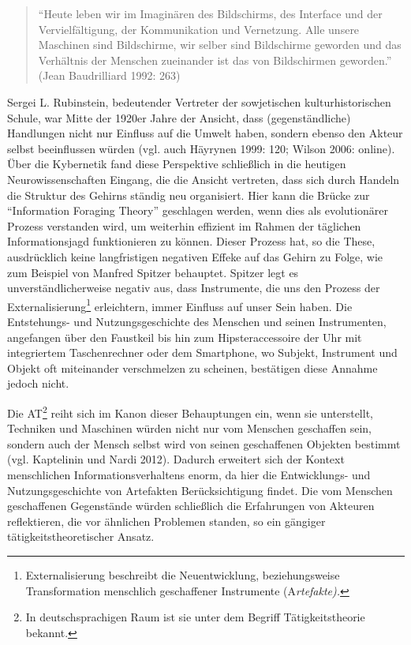 \documentclass[a4paper,
fontsize=11pt,
oneside,
numbers=noperiodatend,
parskip=half-,
bibliography=totoc,
final
]{scrartcl}
\begin{document}
\begin{quote}
\enquote{Heute leben wir im Imaginären des Bildschirms, des Interface
und der Vervielfältigung, der Kommunikation und Vernetzung. Alle unsere
Maschinen sind Bildschirme, wir selber sind Bildschirme geworden und das
Verhältnis der Menschen zueinander ist das von Bildschirmen geworden.}
(Jean Baudrilliard 1992: 263)
\end{quote}

Sergei L. Rubinstein, bedeutender Vertreter der sowjetischen
kulturhistorischen Schule, war Mitte der 1920er Jahre der Ansicht, dass
(gegenständliche) Handlungen nicht nur Einfluss auf die Umwelt haben,
sondern ebenso den Akteur selbst beeinflussen würden (vgl. auch Häyrynen
1999: 120; Wilson 2006: online). Über die Kybernetik fand diese
Perspektive schließlich in die heutigen Neurowissenschaften Eingang, die
die Ansicht vertreten, dass sich durch Handeln die Struktur des Gehirns
ständig neu organisiert. Hier kann die Brücke zur \enquote{Information
Foraging Theory} geschlagen werden, wenn dies als evolutionärer Prozess
verstanden wird, um weiterhin effizient im Rahmen der täglichen
Informationsjagd funktionieren zu können. Dieser Prozess hat, so die
These, ausdrücklich keine langfristigen negativen Effeke auf das Gehirn
zu Folge, wie zum Beispiel von Manfred Spitzer behauptet. Spitzer legt
es unverständlicherweise negativ aus, dass Instrumente, die uns den
Prozess der Externalisierung\footnote{Externalisierung beschreibt die
  Neuentwicklung, beziehungsweise Transformation menschlich geschaffener
  Instrumente (A\emph{rtefakte).}} erleichtern, immer Einfluss auf unser
Sein haben. Die Entstehungs- und Nutzungsgeschichte des Menschen und
seinen Instrumenten, angefangen über den Faustkeil bis hin zum
Hipsteraccessoire der Uhr mit integriertem Taschenrechner oder dem
Smartphone, wo Subjekt, Instrument und Objekt oft miteinander
verschmelzen zu scheinen, bestätigen diese Annahme jedoch nicht.

Die AT\footnote{In deutschsprachigen Raum ist sie unter dem Begriff
  Tätigkeitstheorie bekannt.} reiht sich im Kanon dieser Behauptungen
ein, wenn sie unterstellt, Techniken und Maschinen würden nicht nur vom
Menschen geschaffen sein, sondern auch der Mensch selbst wird von seinen
geschaffenen Objekten bestimmt (vgl. Kaptelinin und Nardi 2012). Dadurch
erweitert sich der Kontext menschlichen Informationsverhaltens enorm, da
hier die Entwicklungs- und Nutzungsgeschichte von Artefakten
Berücksichtigung findet. Die vom Menschen geschaffenen Gegenstände
würden schließlich die Erfahrungen von Akteuren reflektieren, die vor
ähnlichen Problemen standen, so ein gängiger tätigkeitstheoretischer
Ansatz.
\end{document}
